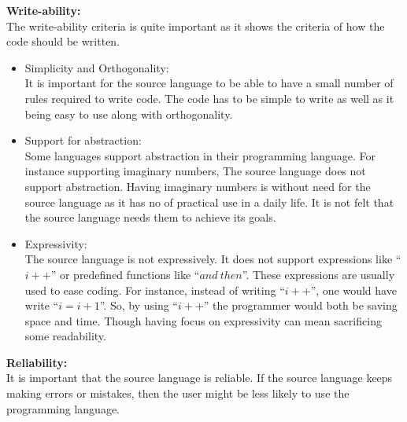 \textbf{Write-ability:} \\
The write-ability criteria is quite important as it shows the criteria of how the code should be written. 
\begin{itemize}
\item Simplicity and Orthogonality: \\
It is important for the source language to be able to have a small number of rules required to write code. The code has to be simple to write as well as it being easy to use along with orthogonality.
\item Support for abstraction: \\
Some languages support abstraction  in their programming language. For instance supporting imaginary numbers, The source language does not support abstraction. Having imaginary numbers is without need for the source language as it has no of practical use in a daily life. It is not felt that the source language needs them to achieve its goals.
\item Expressivity: \\
The source language is not expressively. It does not support expressions like ``$i++$'' or predefined functions like ``$and~then$''. These expressions are usually used to ease coding. For instance, instead of writing ``$i++$'', one would have write ``$i = i + 1$''. So, by using ``$i++$'' the programmer would both be saving space and time. Though having focus on expressivity can mean sacrificing some readability. 
\end{itemize}
\textbf{Reliability:} \\
It is important that the source language is reliable. If the source language keeps making errors or mistakes, then the user might be less likely to use the programming language.
